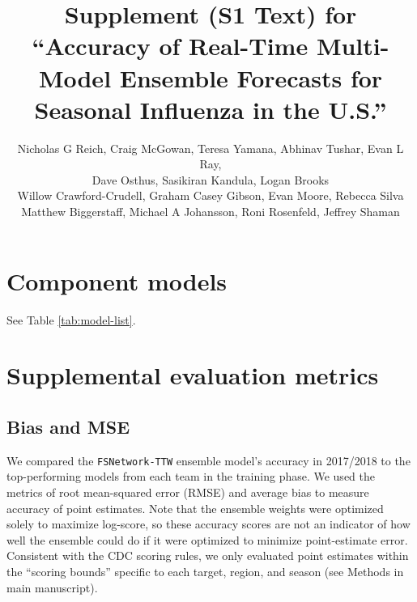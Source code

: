 \documentclass{article}\usepackage[]{graphicx}\usepackage[]{color}
\title{Supplement (S1 Text) for\\``Accuracy of Real-Time Multi-Model Ensemble Forecasts for Seasonal Influenza in the U.S.''}
\author{Nicholas G Reich, Craig McGowan, Teresa Yamana, Abhinav Tushar, Evan L Ray,\\
Dave Osthus, Sasikiran Kandula, Logan Brooks\\
Willow Crawford-Crudell, Graham Casey Gibson, Evan Moore, Rebecca Silva\\Matthew Biggerstaff, Michael A Johansson, Roni Rosenfeld, Jeffrey Shaman}
\begin{document}
\maketitle




\section{Component models}
See Table \ref{tab:model-list}.



% 

\section{Supplemental evaluation metrics}

\subsection{Bias and MSE}

We compared the {\tt FSNetwork-TTW} ensemble model's accuracy in 2017/2018 to the top-performing models from each team in the training phase. 
We used the metrics of root mean-squared error (RMSE) and average bias to measure accuracy of point estimates.
Note that the ensemble weights were optimized solely to maximize log-score, so these accuracy scores are not an indicator of how well the ensemble could do if it were optimized to minimize point-estimate error.
Consistent with the CDC scoring rules, we only evaluated point estimates within the ``scoring bounds'' specific to each target, region, and season (see Methods in main manuscript).
\end{document}
